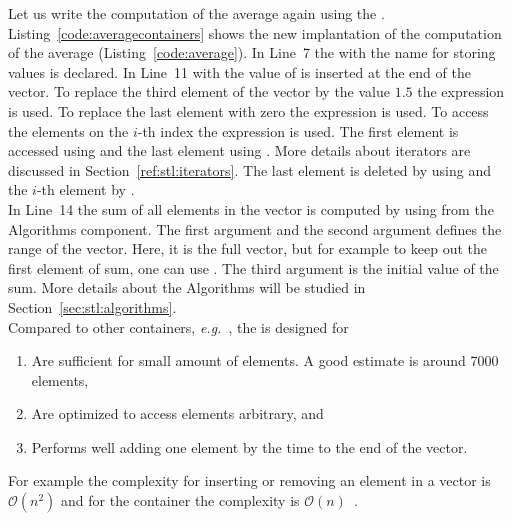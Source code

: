 Let us write the computation of the average again using the . Listing~\ref{code:averagecontainers} shows the new implantation of the computation of the average (Listing~\ref{code:average}). In Line~7 the  with the name  for storing  values is declared. In Line~11 with  the value of  is inserted at the end of the vector. To replace the third element of the vector by the value $1.5$ the expression  is used. To replace the last element with zero the expression  is used. To access the elements on the $i$-th index the expression  is used. The first element is accessed using  and the last element using . More details about iterators are discussed in Section~\ref{ref:stl:iterators}. The last element is deleted by using  and the $i$-th element by .\\


In Line~14 the sum of all elements in the vector is computed by using  from the Algorithms component. The first argument  and the second argument  defines the range of the vector. Here, it is the full vector, but for example to keep out the first element of sum, one can use . The third argument is the initial value of the sum. More details about the Algorithms will be studied in Section~\ref{sec:stl:algorithms}. \\

Compared to other containers, \emph{e.g.}\ , the  is designed for
\begin{enumerate}
\item Are sufficient for small amount of elements. A good estimate is around 7000 elements,
\item Are optimized to access elements arbitrary, and
\item Performs well adding one element by the time to the end of the vector.
\end{enumerate}
For example the complexity for inserting or removing an element in a vector is $\mathcal{O}(n^2)$ and for the container  the complexity is $\mathcal{O}(n)$~\cite{michalewicz2013genetic,knuth1997art}.




